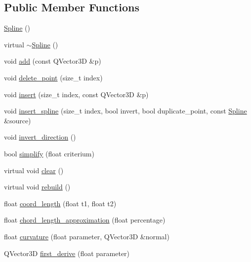 \subsection*{Public Member Functions}
\begin{DoxyCompactItemize}
\item 
\hyperlink{classShipCADGeometry_1_1Spline_a7ad84ea604562c7c9cb309b4e78e25c5}{Spline} ()
\item 
virtual \hyperlink{classShipCADGeometry_1_1Spline_a0c900ca3c99987532e1d0c21ba992968}{$\sim$\-Spline} ()
\item 
void \hyperlink{classShipCADGeometry_1_1Spline_ac3d9f4514573be91b316413bf062791a}{add} (const Q\-Vector3\-D \&p)
\item 
void \hyperlink{classShipCADGeometry_1_1Spline_a120c5530571f138daad61426053220f3}{delete\-\_\-point} (size\-\_\-t index)
\item 
void \hyperlink{classShipCADGeometry_1_1Spline_aa1ea6446e0b59d5cce88580242cd25b6}{insert} (size\-\_\-t index, const Q\-Vector3\-D \&p)
\item 
void \hyperlink{classShipCADGeometry_1_1Spline_aa8e588b92d23c74bb6ec120624b49e54}{insert\-\_\-spline} (size\-\_\-t index, bool invert, bool duplicate\-\_\-point, const \hyperlink{classShipCADGeometry_1_1Spline}{Spline} \&source)
\item 
void \hyperlink{classShipCADGeometry_1_1Spline_a26293a4ee636c2b968c45731425d5c94}{invert\-\_\-direction} ()
\item 
bool \hyperlink{classShipCADGeometry_1_1Spline_a043f418b363a0dc7161b9106a72ef8b4}{simplify} (float criterium)
\item 
virtual void \hyperlink{classShipCADGeometry_1_1Spline_a02967f3eee8b1755eab0d7da55c3c621}{clear} ()
\item 
virtual void \hyperlink{classShipCADGeometry_1_1Spline_a9b466ad7510032dafb0421f2d834bde6}{rebuild} ()
\item 
float \hyperlink{classShipCADGeometry_1_1Spline_a9d4d64a34b1511efc5c41b9e31956a3e}{coord\-\_\-length} (float t1, float t2)
\item 
float \hyperlink{classShipCADGeometry_1_1Spline_ae15513771d88f4f545048d4204e98325}{chord\-\_\-length\-\_\-approximation} (float percentage)
\item 
float \hyperlink{classShipCADGeometry_1_1Spline_a5681a27480f934a73462e53b2b4e2461}{curvature} (float parameter, Q\-Vector3\-D \&normal)
\item 
Q\-Vector3\-D \hyperlink{classShipCADGeometry_1_1Spline_afe15664ac97d1d3452d5a5cfd023c471}{first\-\_\-derive} (float parameter)

\end{DoxyCompactItemize}
